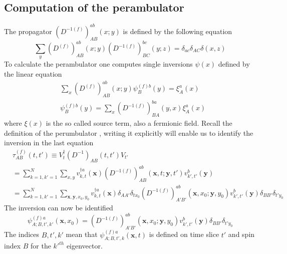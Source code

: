 \subsection{Computation of the perambulator}
    The propagator $(D^{-1(f)})^{ab}_{AB}(x;y)$ is defined by the following equation \cite{four_quark_correlation_functions}
    \begin{equation}
        \sum_{y}(D^{(f)})^{ab}_{AB}(x;y)(D^{-1(f)})^{bc}_{BC}(y;z) = \delta_{ac}\delta_{AC}\delta(x,z)
    \end{equation}
    To calculate the perambulator one computes single inversions $\psi(x)$ defined by the linear equation
    \begin{equation}
        \begin{aligned}\label{inversion_term}
            &\sum_{x}(D^{(f)})^{ab}_{AB}(x;y)\psi^{(f)b}_{B}(y) = \xi^a_A(x)\\
            &\psi^{(f)b}_{B}(y) = \sum_{x}(D^{-1(f)})^{ba}_{BA}(y,x)\xi^a_A(x)
        \end{aligned}
    \end{equation}
    where $\xi(x)$ is the so called source term, also a fermionic field. Recall the definition of the perumbulator , writing it explicitly will enable us to identify the inversion in the last equation \cite{bachelor_thesis_jan}
    \begin{equation}\label{perambulator_explicit}
        \begin{aligned}
            &\tau^{(f)}_{AB}(t,t') \equiv V^\dagger_t(D^{-1})_{AB}(t,t')V_{t'}\\
            &= \sum_{k=1,k'=1}^N \sum_{x,y}
            v_{k,t}^{\dagger a}(\textbf{x}) 
            (D^{-1(f)})^{ab}_{AB}(\textbf{x},t;\textbf{y},t')
            v_{k',t'}^{b}(\textbf{y})\\
            &= \sum_{k=1,k'=1}^N \sum_{\textbf{x},\textbf{y},x_0,y_0}
            v_{k,t}^{\dagger a}(\textbf{x})\delta_{AA'}\delta_{tx_0}
            (D^{-1(f)})^{ab}_{A'B'}(\textbf{x},x_0;\textbf{y},y_0)
            v_{k',t'}^{b}(\textbf{y})\delta_{BB'}\delta_{t'y_0}
        \end{aligned}
    \end{equation}
    The inversion  can now be identified
    \begin{equation}
        \psi^{(f)a}_{A;B,t',k'}(\textbf{x},x_0) = (D^{-1(f)})^{ab}_{A'B'}(\textbf{x},x_0;\textbf{y},y_0)
            v_{k',t'}^{b}(\textbf{y})\delta_{BB'}\delta_{t'y_0}
    \end{equation}
    The indices $B,t',k'$ mean that $\psi^{(f)a}_{A;B,t',k}(\textbf{x},t)$ is defined on time slice $t'$ and spin index $B$ for the $k'^{th}$ eigenvector.\\
    
